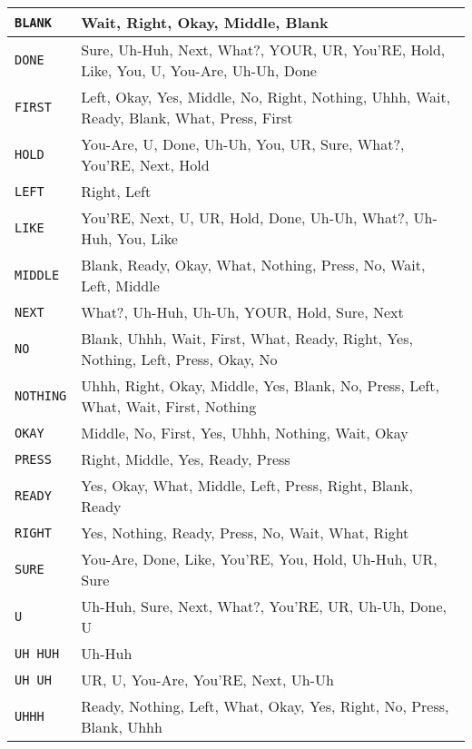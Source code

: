 \documentclass[11pt]{amsart}
\begin{document}
\begin{tabular}{|l|p{4.5in}|}
\hline
\texttt{BLANK}   & Wait, Right, Okay, Middle, Blank \\ \hline
\texttt{DONE}    & Sure, Uh-Huh, Next, What?, YOUR, UR, You'RE, Hold, Like,
                   You, U, You-Are, Uh-Uh, Done \\ \hline
\texttt{FIRST}   & Left, Okay, Yes, Middle, No, Right, Nothing, Uhhh, Wait,
                   Ready, Blank, What, Press, First \\ \hline
\texttt{HOLD}    & You-Are, U, Done, Uh-Uh, You, UR, Sure, What?, You'RE, Next,
                   Hold \\ \hline
\texttt{LEFT}    & Right, Left \\ \hline
\texttt{LIKE}    & You'RE, Next, U, UR, Hold, Done, Uh-Uh, What?, Uh-Huh, You,
                   Like \\ \hline
\texttt{MIDDLE}  & Blank, Ready, Okay, What, Nothing, Press, No, Wait, Left,
                   Middle \\ \hline
\texttt{NEXT}    & What?, Uh-Huh, Uh-Uh, YOUR, Hold, Sure, Next \\ \hline
\texttt{NO}      & Blank, Uhhh, Wait, First, What, Ready, Right, Yes, Nothing,
                   Left, Press, Okay, No \\ \hline
\texttt{NOTHING} & Uhhh, Right, Okay, Middle, Yes, Blank, No, Press, Left,
                   What, Wait, First, Nothing \\ \hline
\texttt{OKAY}    & Middle, No, First, Yes, Uhhh, Nothing, Wait, Okay \\ \hline
\texttt{PRESS}   & Right, Middle, Yes, Ready, Press \\ \hline
\texttt{READY}   & Yes, Okay, What, Middle, Left, Press, Right, Blank, Ready \\
                   \hline
\texttt{RIGHT}   & Yes, Nothing, Ready, Press, No, Wait, What, Right \\ \hline
\texttt{SURE}    & You-Are, Done, Like, You'RE, You, Hold, Uh-Huh, UR, Sure \\
                   \hline
\texttt{U}       & Uh-Huh, Sure, Next, What?, You'RE, UR, Uh-Uh, Done, U \\
                   \hline
\texttt{UH HUH}  & Uh-Huh \\ \hline
\texttt{UH UH}   & UR, U, You-Are, You'RE, Next, Uh-Uh \\ \hline
\texttt{UHHH}    & Ready, Nothing, Left, What, Okay, Yes, Right, No, Press,
                   Blank, Uhhh \\ \hline

\end{tabular}
\end{document}
